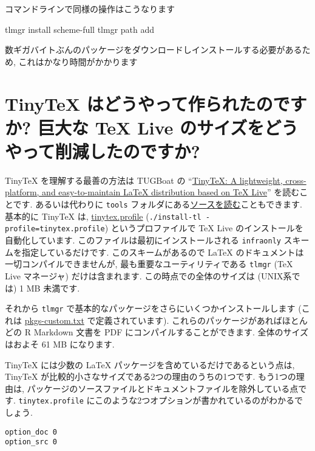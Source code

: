 \documentclass[
  xelatex,ja=standard,jafont=noto]{bxjsreport}
\newenvironment{Shaded}{\begin{snugshade}}{\end{snugshade}}
\newcommand{\ExtensionTok}[1]{#1}
\newcommand{\NormalTok}[1]{#1}
\begin{document}
コマンドラインで同様の操作はこうなります

\begin{Shaded}
\begin{Highlighting}[]
\ExtensionTok{tlmgr}\NormalTok{ install scheme{-}full}
\ExtensionTok{tlmgr}\NormalTok{ path add}
\end{Highlighting}
\end{Shaded}

数ギガバイトぶんのパッケージをダウンロードしインストールする必要があるため,
これはかなり時間がかかります

\hypertarget{faq-size}{%
\section{TinyTeX はどうやって作られたのですか? 巨大な TeX Live
のサイズをどうやって削減したのですか?}\label{faq-size}}

TinyTeX を理解する最善の方法は TUGBoat の
``\href{https://tug.org/TUGboat/Contents/contents40-1.html}{TinyTeX: A
lightweight, cross-platform, and easy-to-maintain LaTeX distribution
based on TeX Live}'' を読むことです. あるいは代わりに \texttt{tools}
フォルダにある\href{https://github.com/yihui/tinytex/}{ソースを読む}こともできます.
基本的に TinyTeX は,
\href{https://github.com/yihui/tinytex/blob/master/tools/tinytex.profile}{tinytex.profile}
(\texttt{./install-tl\ -profile=tinytex.profile}) というプロファイルで
TeX Live のインストールを自動化しています.
このファイルは最初にインストールされる \texttt{infraonly}
スキームを指定しているだけです. このスキームがあるので LaTeX
のドキュメントは一切コンパイルできませんが,
最も重要なユーティリティである \texttt{tlmgr} (TeX Live マネージャ)
だけは含まれます. この時点での全体のサイズは (UNIX系では) 1 MB 未満です.

それから \texttt{tlmgr}
で基本的なパッケージをさらにいくつかインストールします (これは
\href{https://github.com/yihui/tinytex/blob/master/tools/pkgs-custom.txt}{pkgs-custom.txt}
で定義されています). これらのパッケージがあればほとんどの R Markdown
文書を PDF にコンパイルすることができます. 全体のサイズはおよそ 61 MB
になります.

TinyTeX には少数の LaTeX パッケージを含めているだけであるという点は,
TinyTeX が比較的小さなサイズである2つの理由のうちの1つです.
もう1つの理由は,
パッケージのソースファイルとドキュメントファイルを除外している点です.
\texttt{tinytex.profile}
にこのような2つオプションが書かれているのがわかるでしょう.

\begin{verbatim}
option_doc 0
option_src 0
\end{verbatim}
\end{document}

